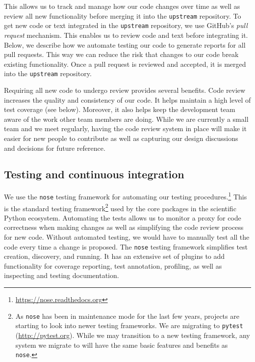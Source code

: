 \documentclass[]{article}
\begin{document}
This allows us to track and manage how our code changes over time as well as
review all new functionality before merging it into the \texttt{upstream}
repository.
To get new code or text integrated in the \texttt{upstream} repository, we use
GitHub's \emph{pull request} mechanism.
This enables us to review code and text before integrating it.
Below, we describe how we automate testing our code to generate reports for all
pull requests.
This way we can reduce the risk that changes to our code break existing
functionality.
Once a pull request is reviewed and accepted, it is merged into the
\texttt{upstream} repository.

Requiring all new code to undergo review provides several benefits.
Code review increases the quality and consistency of our code.
It helps maintain a high level of test coverage (see below).
Moreover, it also helps keep the development team aware of the work other team
members are doing.
While we are currently a small team and we meet regularly, having the code
review system in place will make it easier for new people to contribute as well
as capturing our design discussions and decisions for future reference.

\subsection{Testing and continuous integration}

We use the \texttt{nose} testing framework for automating our testing
procedures.\footnote{\url{https://nose.readthedocs.org}}
This is the standard testing framework\footnote{
    As \texttt{nose} has been in
    maintenance mode for the last few years, projects are starting to look
    into newer testing frameworks.
    We are migrating to \texttt{pytest} (\url{http://pytest.org}).
    While we may transition to a new testing framework, any system we
    migrate to will have the same basic features and benefits as \texttt{nose}.
}
used by the core packages in the scientific Python ecosystem.
Automating the tests allows us to monitor a proxy for code correctness when
making changes as well as simplifying the code review process for new code.
Without automated testing, we would have to manually test all the code every
time a change is proposed.
The \texttt{nose} testing framework simplifies test creation, discovery, and
running.
It has an extensive set of plugins to add functionality for coverage reporting,
test annotation, profiling, as well as inspecting and testing documentation.
\end{document}
